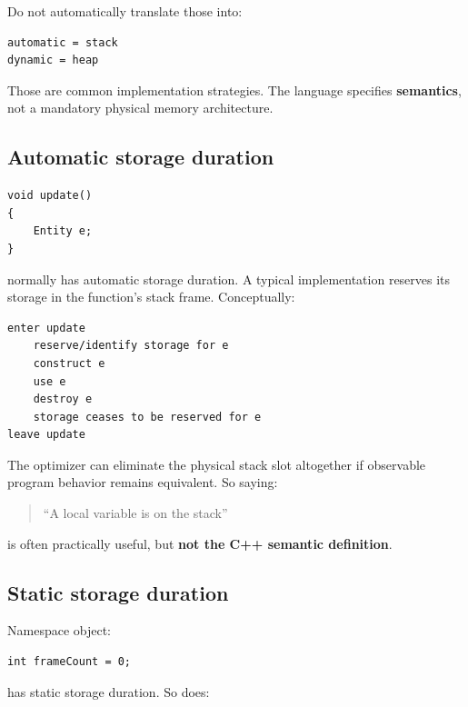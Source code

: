 Do not automatically translate those into:

\begin{verbatim}
automatic = stack
dynamic = heap
\end{verbatim}

Those are common implementation strategies. The language specifies \textbf{semantics}, not a mandatory physical memory architecture.

\subsection{Automatic storage duration}\label{05-engine-i-ch002-automatic-storage-duration}

\hypertarget{05-engine-i-ch002-automatic-storage-duration}{}

\begin{verbatim}
void update()
{
    Entity e;
}
\end{verbatim}

 normally has automatic storage duration. A typical implementation reserves its storage in the function's stack frame. Conceptually:

\begin{verbatim}
enter update
    reserve/identify storage for e
    construct e
    use e
    destroy e
    storage ceases to be reserved for e
leave update
\end{verbatim}

The optimizer can eliminate the physical stack slot altogether if observable program behavior remains equivalent. So saying:

\begin{quote}
``A local variable is on the stack''
\end{quote}

is often practically useful, but \textbf{not the C++ semantic definition}.

\subsection{Static storage duration}\label{05-engine-i-ch002-static-storage-duration}

\hypertarget{05-engine-i-ch002-static-storage-duration}{}

Namespace object:

\begin{verbatim}
int frameCount = 0;
\end{verbatim}

has static storage duration. So does:


